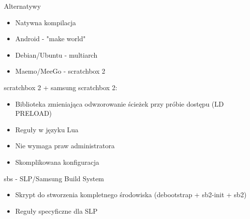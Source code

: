 \documentclass[presentation,aspectratio=43,12pt]{beamer}
\begin{document}
\begin{frame}[label=sec-3-3]{Alternatywy}
\begin{itemize}
\item Natywna kompilacja

\item Android - "make world"

\item Debian/Ubuntu - multiarch

\item Maemo/MeeGo - scratchbox 2
\end{itemize}

\end{frame}

\begin{frame}[label=sec-3-4]{scratchbox 2 + samsung}
scratchbox 2:
\begin{itemize}
\item Biblioteka zmieniająca odwzorowanie ścieżek przy próbie dostępu
(LD PRELOAD)
\item Reguły w języku Lua
\item Nie wymaga praw administratora
\item Skomplikowana konfiguracja
\end{itemize}

\pause\vskip0.5cm

sbs - SLP/Samsung Build System
\begin{itemize}
\item Skrypt do stworzenia kompletnego środowiska (debootstrap + sb2-init + sb2)
\item Reguły specyficzne dla SLP
\end{itemize}
\end{frame}
\end{document}

